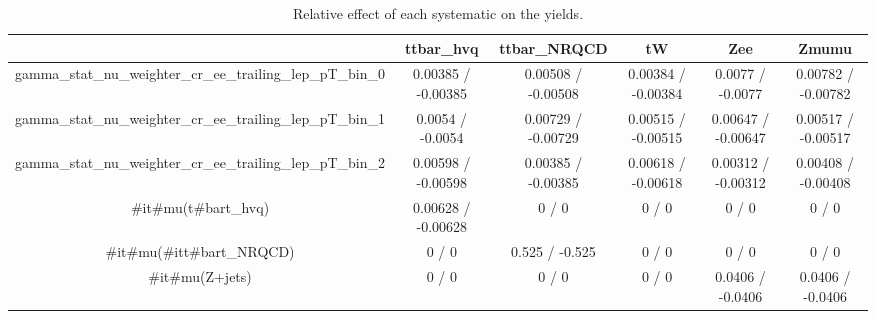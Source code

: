 \documentclass[10pt]{article}
\begin{document}
\begin{table}[htbp]
\begin{center}
\begin{tabular}{|c|c|c|c|c|c|}
\hline 
      & ttbar_hvq      & ttbar_NRQCD      & tW      & Zee      & Zmumu \\ 
\hline 
  gamma_stat_nu_weighter_cr_ee_trailing_lep_pT_bin_0 & 0.00385 / -0.00385 & 0.00508 / -0.00508 & 0.00384 / -0.00384 & 0.0077 / -0.0077 & 0.00782 / -0.00782 \\ 
  gamma_stat_nu_weighter_cr_ee_trailing_lep_pT_bin_1 & 0.0054 / -0.0054 & 0.00729 / -0.00729 & 0.00515 / -0.00515 & 0.00647 / -0.00647 & 0.00517 / -0.00517 \\ 
  gamma_stat_nu_weighter_cr_ee_trailing_lep_pT_bin_2 & 0.00598 / -0.00598 & 0.00385 / -0.00385 & 0.00618 / -0.00618 & 0.00312 / -0.00312 & 0.00408 / -0.00408 \\ 
  #it{#mu}(t#bar{t}_{hvq}) & 0.00628 / -0.00628 & 0 / 0 & 0 / 0 & 0 / 0 & 0 / 0 \\ 
  #it{#mu}(#it{t#bar{t}}_{NRQCD}) & 0 / 0 & 0.525 / -0.525 & 0 / 0 & 0 / 0 & 0 / 0 \\ 
  #it{#mu}(Z+jets) & 0 / 0 & 0 / 0 & 0 / 0 & 0.0406 / -0.0406 & 0.0406 / -0.0406 \\ 
\hline 
\end{tabular} 
\caption{Relative effect of each systematic on the yields.} 
\end{center} 
\end{table} 
\end{document}
